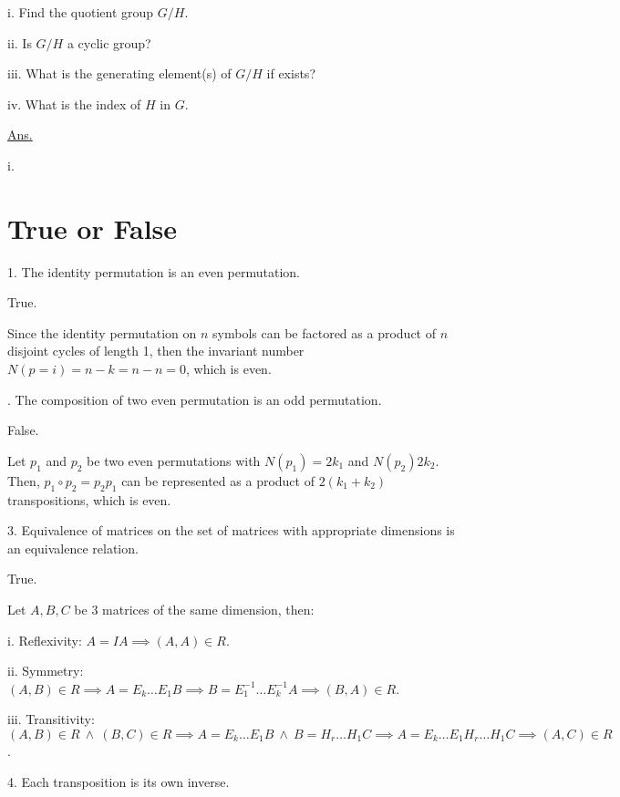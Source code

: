 \documentclass{article}
\begin{document}
\qquad i. Find the quotient group $G/H$.

\qquad ii. Is $G/H$ a cyclic group?

\qquad iii. What is the generating element(s) of $G/H$ if exists?

\qquad iv. What is the index of $H$ in $G$.
\newline

\underline{Ans.}

i. 




% 



\newpage

\section*{True or False}

1. The identity permutation is an even permutation.

True.

Since the identity permutation on $n$ symbols can be factored as a product of $n$ disjoint cycles of length 1, then the invariant number $N(p=i)= n - k = n - n = 0$, which is even.
\newline

. The composition of two even permutation is an odd permutation.

False.

Let $p_1$ and $p_2$ be two even permutations with $N(p_1)=2k_1$ and $N(p_2)2k_2$. Then, $p_1 \circ p_2 = p_2p_1$ can be represented as a product of $2(k_1+k_2)$ transpositions, which is even.
\newline

3. Equivalence of matrices on the set of matrices with appropriate dimensions is an equivalence relation.

True.

Let $A,B,C$ be 3 matrices of the same dimension, then:

\qquad i. Reflexivity: $A = IA \implies (A,A) \in R$.

\qquad ii. Symmetry: $(A,B) \in R \implies A=E_k\ldots E_1 B \implies B = E_1^{-1} \ldots E_k^{-1}A \implies (B,A) \in R$.

\qquad iii. Transitivity: $(A,B) \in R \ \land \ (B,C) \in R \implies A=E_k\ldots E_1 B \ \land \ B=H_r\ldots H_1 C \implies A=E_k\ldots E_1 H_r \ldots H_1 C \implies (A,C) \in R$.
\newline

4. Each transposition is its own inverse.
\end{document}
